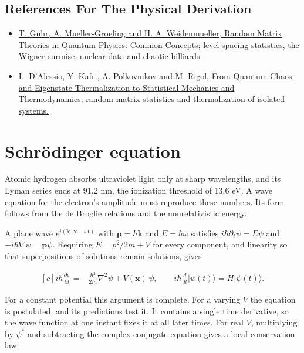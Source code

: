 \documentclass[11pt,oneside]{book}
\newenvironment{centeredalign}{\[\begin{gathered}[c]}{\end{gathered}\]}
\begin{document}
\subsection*{References For The Physical Derivation}
\begin{itemize}
\item \href{https://arxiv.org/abs/cond-mat/9707301}{T. Guhr, A. Mueller-Groeling and H. A. Weidenmueller, Random Matrix Theories in Quantum Physics: Common Concepts; level spacing statistics, the Wigner surmise, nuclear data and chaotic billiards.}
\item \href{https://arxiv.org/abs/1509.06411}{L. D'Alessio, Y. Kafri, A. Polkovnikov and M. Rigol, From Quantum Chaos and Eigenstate Thermalization to Statistical Mechanics and Thermodynamics; random-matrix statistics and thermalization of isolated systems.}
\end{itemize}





\clearpage

\section{Schrödinger equation}

\label{topic:schr-dinger-equation}

Atomic hydrogen absorbs ultraviolet light only at sharp wavelengths, and its Lyman series ends at 91.2 nm, the ionization threshold of 13.6 eV. A wave equation for the electron's amplitude must reproduce these numbers. Its form follows from the de Broglie relations and the nonrelativistic energy.

A plane wave \(e^{i(\mathbf k\cdot\mathbf x-\omega t)}\) with \(\mathbf p=\hbar\mathbf k\) and \(E=\hbar\omega\) satisfies \(i\hbar\partial_t\psi=E\psi\) and \(-i\hbar\nabla\psi=\mathbf p\psi\). Requiring \(E=p^2/2m+V\) for every component, and linearity so that superpositions of solutions remain solutions, gives

\begin{centeredalign}
i\hbar\frac{\partial\psi}{\partial t}=-\frac{\hbar^2}{2m}\nabla^2\psi+V(\mathbf x)\,\psi,
\qquad i\hbar\frac{d}{dt}|\psi(t)\rangle=H|\psi(t)\rangle.
\end{centeredalign}

For a constant potential this argument is complete. For a varying \(V\) the equation is postulated, and its predictions test it. It contains a single time derivative, so the wave function at one instant fixes it at all later times. For real \(V\), multiplying by \(\psi^*\) and subtracting the complex conjugate equation gives a local conservation law:
\end{document}
